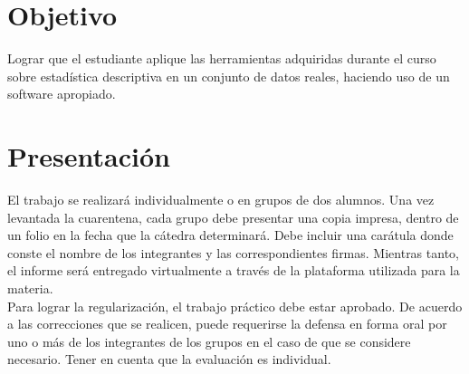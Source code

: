\documentclass{../prob}
\begin{document}
\maketitle

\section*{Objetivo}
Lograr que el estudiante aplique las herramientas adquiridas durante el curso sobre estadística descriptiva en un conjunto de datos reales, haciendo uso de un software apropiado.
	
\section*{Presentación}
El trabajo se realizará individualmente o en grupos de dos alumnos. Una vez levantada la cuarentena, cada grupo debe presentar una copia impresa, dentro de un folio en la fecha que la cátedra determinará. Debe incluir una carátula donde conste el nombre de los integrantes y las correspondientes firmas. Mientras tanto, el informe será entregado virtualmente a través de la plataforma utilizada para la materia.\\
Para lograr la regularización, el trabajo práctico debe estar aprobado. De acuerdo a las correcciones que se realicen, puede requerirse la defensa en forma oral por uno o más de los integrantes de los grupos en el caso de que se considere necesario. Tener en cuenta que la evaluación es individual.	
\end{document}
